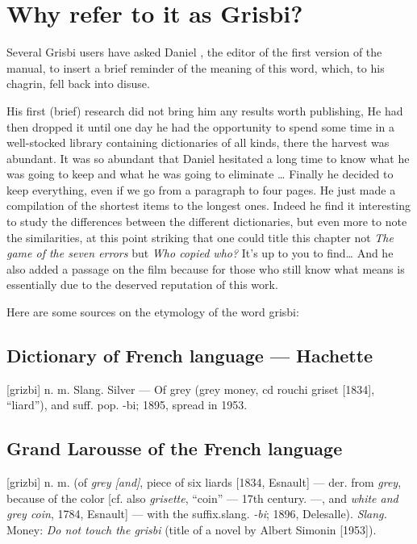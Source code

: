 \newpage 
\section{Why refer to it as Grisbi?\label{preamble-etymology}}

Several \gls{Grisbi} users have asked Daniel , the editor of the first version of the manual, to insert a brief reminder of the meaning of this word, which, to his chagrin, fell back into disuse.

His first (brief) research did not bring him any results worth publishing, He had then dropped it until one day he had the opportunity to spend some time in a well-stocked library containing dictionaries of all kinds, there the harvest was abundant. It was so abundant that Daniel  hesitated a long time to know what he was going to keep and what he was going to eliminate \dots{}
Finally he decided to keep everything, even if we go from a paragraph to four pages. He just made a compilation of the shortest items to the longest ones.
Indeed he find it interesting to study the differences between the different dictionaries, but even more to note the similarities, at this point striking that one could title this chapter not \emph{The game of the seven errors} but \emph{Who copied who?} It's up to you to find\dots{}
And he also added a passage on the film because for those who still know what  means is essentially due to the deserved reputation of this work.

Here are some sources on the etymology  of the word grisbi:

\subsection*{Dictionary of French language --- Hachette}

[grizbi] n. m. Slang. Silver --- Of grey (grey money, cd rouchi griset [1834], ``liard''), and suff. pop. -bi; 1895, spread in 1953.

\subsection*{Grand Larousse of the French language}

[grizbi] n. m. (of \emph{grey [and]}, piece of six liards [1834, Esnault] --- der.
from \emph{grey}, because of the color [cf. also \emph{grisette}, ``coin'' --- 17th century. ---, and \emph{white and grey coin}, 1784, Esnault] --- with the suffix.slang. \emph{-bi}; 1896, Delesalle).
\emph{Slang.} Money: \emph{Do not touch the grisbi} (title of a novel by Albert Simonin [1953]).

